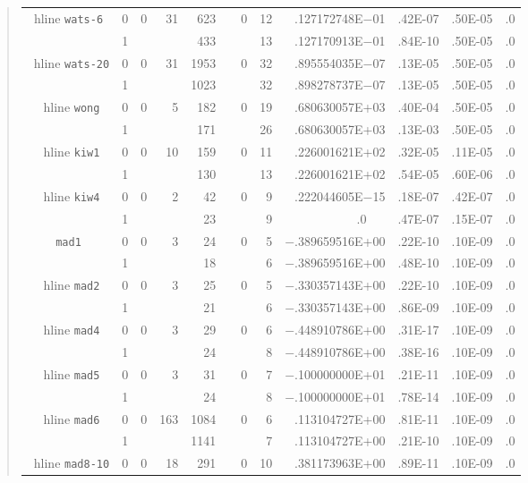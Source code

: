 \begin{quote}
{\begin{tabular}{cccccccrllc}
hline
{\tt wats-6}& 0 &0&~31&~623&~~0&12&   .127172748E$-$01&.42E-07 & .50E-05&.0 \\
            & 1 & &   &~433&   &13&   .127170913E$-$01&.84E-10 & .50E-05 &.0\\\
hline
{\tt wats-20}& 0 &0&~31&1953&~~0&32&  .895554035E$-$07&.13E-05 & .50E-05 &.0\\
            & 1 & &   &1023&   &32&   .898278737E$-$07&.13E-05 & .50E-05 &.0\\\
hline
{\tt wong}  & 0 &0&~~5&~182&~~0&19&   .680630057E+03  &.40E-04 & .50E-05 &.0\\
            & 1 & &   &~171&   &26&   .680630057E+03  &.13E-03 & .50E-05 &.0\\\
hline
{\tt kiw1}  & 0 &0&~10&~159&~~0&11&   .226001621E+02  &.32E-05 & .11E-05 &.0\\
            & 1 & &   &~130&   &13&   .226001621E+02  &.54E-05 & .60E-06 &.0\\\
hline
{\tt kiw4}  & 0 &0&~~2&~~42&~~0&~9&   .222044605E$-$15&.18E-07 &.42E-07&.0  \\
            & 1 & &   &~~23&   &~9&  .0\hspace{5.75em}~~~&.47E-07 &.15E-07 &.0 
\\\hline
{\tt mad1}  & 0 &0&~~3&~~24&~~0&~5&$-$.389659516E+00  &.22E-10 & .10E-09 &.0\\
            & 1 & &   &~~18&   &~6&$-$.389659516E+00  &.48E-10 & .10E-09 &.0\\\
hline
{\tt mad2}  & 0 &0&~~3&~~25&~~0&~5&$-$.330357143E+00  &.22E-10 & .10E-09 &.0\\
            & 1 & &   &~~21&   &~6&$-$.330357143E+00  &.86E-09 & .10E-09 &.0\\\
hline
{\tt mad4}  & 0 &0&~~3&~~29&~~0&~6&$-$.448910786E+00  &.31E-17 & .10E-09 &.0\\
            & 1 & &   &~~24&   &~8&$-$.448910786E+00  &.38E-16 & .10E-09 &.0\\\
hline
{\tt mad5}  & 0 &0&~~3&~~31&~~0&~7&$-$.100000000E+01  &.21E-11 & .10E-09 &.0\\
            & 1 & &   &~~24&   &~8&$-$.100000000E+01  &.78E-14 & .10E-09 &.0\\\
hline
{\tt mad6}  & 0 &0&163&1084&~~0&~6&   .113104727E+00  &.81E-11 & .10E-09 &.0\\
            & 1 & &   &1141&   &~7&   .113104727E+00  &.21E-10 & .10E-09 &.0\\\
hline
{\tt mad8-10}& 0&0&~18&~291&~~0&10&   .381173963E+00  &.89E-11 & .10E-09 &.0\\

\end{tabular}}
\end{quote}
